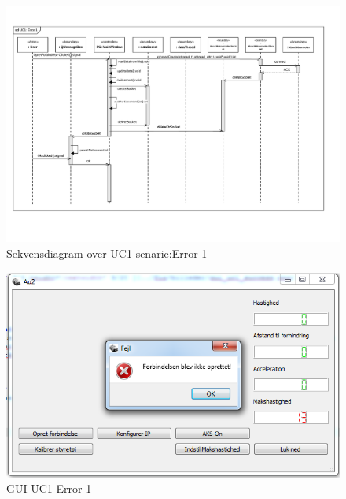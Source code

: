 \begin{figure}[H]
\centering
\includegraphics[width=\textwidth* 1,height=\textwidth* 1 ]{../fig/diagrammer/pc/sd_uc1_Error_1.pdf}
\caption{Sekvensdiagram over UC1 senarie:Error 1}
\label{fig:cd_uc1_error_1}
\end{figure}

\begin{figure}[H]
\centering
\includegraphics[width=\textwidth* 3/4,height=\textwidth* 9/20 ]{../fig/billeder/gui_uc1_error_1.png}
\caption{GUI UC1 Error 1}
\label{fig:GUI_uc1_error_1}
\end{figure}

